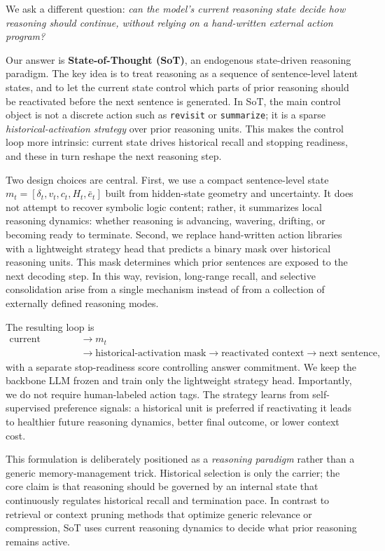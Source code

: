 \documentclass{article}
\begin{document}
We ask a different question: \emph{can the model's current reasoning state decide how reasoning should continue, without relying on a hand-written external action program?}

Our answer is \textbf{State-of-Thought (SoT)}, an endogenous state-driven reasoning paradigm. The key idea is to treat reasoning as a sequence of sentence-level latent states, and to let the current state control which parts of prior reasoning should be reactivated before the next sentence is generated. In SoT, the main control object is not a discrete action such as \texttt{revisit} or \texttt{summarize}; it is a sparse \emph{historical-activation strategy} over prior reasoning units. This makes the control loop more intrinsic: current state drives historical recall and stopping readiness, and these in turn reshape the next reasoning step.

Two design choices are central. First, we use a compact sentence-level state $m_t=[\delta_t,v_t,c_t,H_t,\bar e_t]$ built from hidden-state geometry and uncertainty. It does not attempt to recover symbolic logic content; rather, it summarizes local reasoning dynamics: whether reasoning is advancing, wavering, drifting, or becoming ready to terminate. Second, we replace hand-written action libraries with a lightweight strategy head that predicts a binary mask over historical reasoning units. This mask determines which prior sentences are exposed to the next decoding step. In this way, revision, long-range recall, and selective consolidation arise from a single mechanism instead of from a collection of externally defined reasoning modes.

The resulting loop is
\[
\begin{aligned}
\text{current sentence}
&\rightarrow m_t \\
&\rightarrow \text{historical-activation mask}
\rightarrow \text{reactivated context}
\rightarrow \text{next sentence},
\end{aligned}
\]
with a separate stop-readiness score controlling answer commitment. We keep the backbone LLM frozen and train only the lightweight strategy head. Importantly, we do not require human-labeled action tags. The strategy learns from self-supervised preference signals: a historical unit is preferred if reactivating it leads to healthier future reasoning dynamics, better final outcome, or lower context cost.

This formulation is deliberately positioned as a \emph{reasoning paradigm} rather than a generic memory-management trick. Historical selection is only the carrier; the core claim is that reasoning should be governed by an internal state that continuously regulates historical recall and termination pace. In contrast to retrieval or context pruning methods that optimize generic relevance or compression, SoT uses current reasoning dynamics to decide what prior reasoning remains active.
\end{document}
